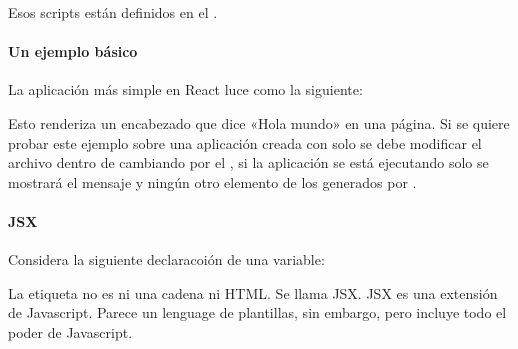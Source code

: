 Esos scripts están definidos en el .


\paragraph{Un ejemplo básico}
\label{\detokenize{reactjs:un-ejemplo-basico}}
La aplicación más simple en React luce como la siguiente:

%
\begin{sphinxVerbatim}[commandchars=\\\{\}]
    
\end{sphinxVerbatim}

Esto renderiza un encabezado que dice «Hola mundo» en una página.
Si se quiere probar este ejemplo sobre una aplicación creada con
 solo se debe modificar el archivo  dentro
de  cambiando  por el , si la aplicación
se está ejecutando solo se mostrará el mensaje y ningún otro elemento de los
generados por .


\paragraph{JSX}
\label{\detokenize{reactjs:jsx}}
Considera la siguiente declaracoión de una variable:

%
\begin{sphinxVerbatim}[commandchars=\\\{\}]
    
\end{sphinxVerbatim}

La etiqueta  no es ni una cadena ni HTML. Se llama JSX. JSX es una
extensión de Javascript. Parece un lenguage de plantillas, sin embargo, pero
incluye todo el poder de Javascript.

